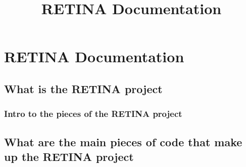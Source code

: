 \documentclass[
]{article}
\title{RETINA Documentation}
\author{}
\date{}
\begin{document}
\maketitle

\section{RETINA Documentation}\label{retina-documentation}

\subsection{What is the RETINA
project}\label{what-is-the-retina-project}

\subsubsection{Intro to the pieces of the RETINA
project}\label{intro-to-the-pieces-of-the-retina-project}

\subsection{What are the main pieces of code that make up the RETINA
project}\label{what-are-the-main-pieces-of-code-that-make-up-the-retina-project}
\end{document}
